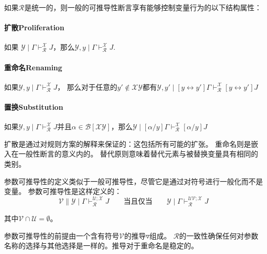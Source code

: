 如果$ \mathcal{R} $是统一的，则一般的可推导性断言享有能够控制变量行为的以下结构属性：

\paragraph{扩散Proliferation} 
如果 $\mathcal{Y} \mid \Gamma \vdash_{\mathcal{R}}^{\mathcal{X}} J$，那么$\mathcal{Y}, y \mid \Gamma \vdash_{\mathcal{R}}^{\mathcal{X}} J$.

\paragraph{重命名Renaming} 
如果$\mathcal{Y}, y \mid \Gamma \vdash_{\mathcal{R}}^{\mathcal{X}} J$，
那么对于任意的$y' \notin \mathcal{XY}$都有$\mathcal{Y},y' \mid [y \leftrightarrow y'] \Gamma \vdash_{\mathcal{R}}^{\mathcal{X}} [y \leftrightarrow y'] J$

\paragraph{置换Substitution} 
如果$\mathcal{Y}, y \mid \Gamma \vdash_{\mathcal{R}}^{\mathcal{X}} J$并且$\alpha \in \mathcal{B}[\mathcal{XY}]$，那么$\mathcal{Y} \mid [\alpha / y] \Gamma \vdash_{\mathcal{R}}^{\mathcal{X}} [\alpha / y] J$

扩散是通过对规则方案的解释来保证的：这包括所有可能的扩张。
重命名则是嵌入在一般性断言的意义内的。
替代原则意味着替代元素与被替换变量具有相同的类别。

参数可推导性的定义类似于一般可推导性，尽管它是通过对符号进行一般化而不是变量。
参数可推导性是这样定义的：
$$ \mathcal{V} \parallel \mathcal{Y} \mid \Gamma \vdash_{\mathcal{R}}^{\mathcal{U};\mathcal{X}} J \qquad \text{当且仅当} \qquad \mathcal{Y} \mid \Gamma \vdash_{\mathcal{R}}^{\mathcal{UV};\mathcal{X}} J$$

其中$\mathcal{V} \cap \mathcal{U} = \emptyset$。

参数可推导性的前提由一个含有符号$\mathcal{V}$的推导$\triangledown$组成。
$ \mathcal{R} $的一致性确保任何对参数名称的选择与其他选择是一样的。推导对于重命名是稳定的。

